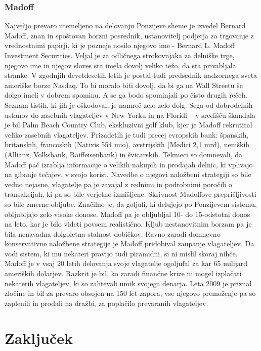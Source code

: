 \documentclass[letterpaper, titlepage, freqn]{article}
\begin{document}
\subsubsection{Madoff}
Največjo prevaro utemeljeno na delovanju Ponzijeve sheme je izvedel Bernard Madoff, znan in spoštovan borzni posrednik, ustanovitelj podjetja za trgovanje z vrednostnimi papirji, ki je pozneje nosilo njegovo ime - Bernard L. Madoff Investment Securities. Veljal je za odličnega strokovnjaka za delniške trge, njegovo ime in njegov sloves sta imela dovolj veliko težo, da sta privabljala stranke. V zgodnjih devetdesetih letih je postal tudi predsednik nadzornega sveta ameriške borze Nasdaq.
To bi moralo biti dovolj, da bi ga na Wall Streetu še dolgo imeli v dobrem spominu. A se ga bodo spominjali po čisto drugih rečeh. Seznam tistih, ki jih je oškodoval, je namreč zelo zelo dolg. Sega od dobrodelnih ustanov do zasebnih vlagateljev v New Yorku in na Floridi – v središču škandala je bil Palm Beach Country Club, ekskluzivni golf klub, kjer je Madoff rekrutiral veliko zasebnih vlagateljev. Prizadetih je tudi precej evropskih bank: španskih, britanskih, francoskih (Natixis 554 mio), avstrijskih (Medici 2,1 mrd), nemških (Allianz, Volksbank, Raiffeisenbank) in švicarskih.
Tekmeci so domnevali, da Madoff pač izrablja informacije o velikih nakupih in prodajah delnic, ki vplivajo na gibanje tečajev, v svojo korist. Navedbe o njegovi naložbeni strategiji so bile vedno nejasne, vlagatelje pa je zavajal z rednimi in podrobnimi poročili o transakcijah, ki pa so bile verjetno izmišljene.
Skrivnost Madoffove prepričljivosti so bile zmerne obljube. Značilno je, da goljufi, ki delujejo po Ponzijevem sistemu, obljubljajo zelo visoke donose. Madoff pa je obljubljal 10- do 15-odstotni donos na leto, kar je bilo videti povsem realistično. Kljub nestanovitnim borzam pa je bila nenavadna dolgoletna stalnost dobičkov. Ravno zaradi domnevno konservativne naložbene strategije je Madoff pridobival zaupanje vlagateljev. Da vodi sistem, ki mu nekateri pravijo tudi piramidni, si ni mislil skoraj nihče.
Madoff je v vsaj 20 letih delovanja svoje vlagatelje ogoljufal za kar 65 milijard ameriških dolarjev. Razkrit je bil, ko zaradi finančne krize ni mogel izplačati nekaterih vlagateljev, ki so zahtevali umik svojega denarja. Leta 2009 je priznal zločine in bil za prevaro obsojen na 150 let zapora, vse njegovo premoženje pa so zaplenili in prodali na dražbi, za poplačilo prevaranih vlagateljev.


\section{Zaključek}
\end{document}
